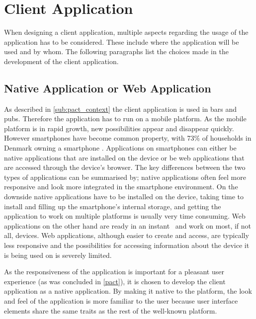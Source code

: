 \section{Client Application}
\label{ssub:client_application}

When designing a client application, multiple aspects regarding the usage of the application has to be considered. These include where the application will be used and by whom. The following paragraphs list the choices made in the development of the client application.

\subsection{Native Application or Web Application}
\label{par:native_application_or_web_application}

As described in \cref{sub:pact_context} the client application is used in bars and pubs. Therefore the application has to run on a mobile platform. As the mobile platform is in rapid growth, new possibilities appear and disappear quickly. However smartphones have become common property, with 73\% of households in Denmark owning a smartphone \cite{smartphone2014}. Applications on smartphones can either be native applications that are installed on the device or be web applications that are accessed through the device's browser. The key differences between the two types of applications can be summarised by; native applications often feel more responsive and look more integrated in the smartphone environment. On the downside native applications have to be installed on the device, taking time to install and filling up the smartphone's internal storage, and getting the application to work on multiple platforms is usually very time consuming. Web applications on the other hand are ready in an instant~\cite{charland2011mobile} and work on most, if not all, devices. Web applications, although easier to create and access, are typically less responsive and the possibilities for accessing information about the device it is being used on is severely limited.

As the responsiveness of the application is important for a pleasant user experience (as was concluded in \cref{pact}), it is chosen to develop the client application as a native application. By making it native to the platform, the look and feel of the application is more familiar to the user because user interface elements share the same traits as the rest of the well-known platform.

